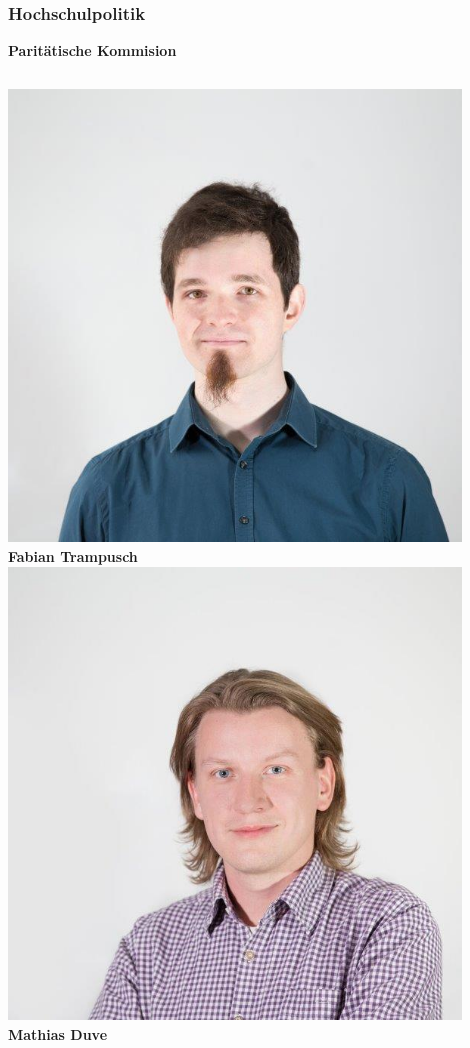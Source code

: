 \documentclass{beamer}
\begin{document}
    \begin{frame}[t]
    	\frametitle{Hochschulpolitik}
    	\textbf{Paritätische Kommision}
    	\bigskip
    	\begin{columns}[t]
    		\includegraphics[width=0.9\textwidth]{fabian.jpg}
    		\\
    		\textbf{Fabian Trampusch}
    		\includegraphics[width=0.9\textwidth]{matti.jpg}
    		\\
    		\textbf{Mathias Duve}
    	\end{columns}
    \end{frame}
    
\end{document}
